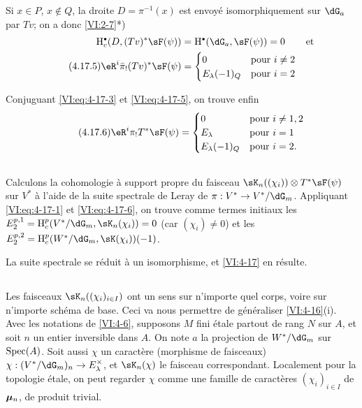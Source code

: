 Si $x\in P$, $x\notin Q$, la droite $D=\pi^{-1}(x)$ est envoy\'e 
isomorphiquement sur $\dG_a$ par $T v$; on a donc 
\ref{VI:2-7}*) 
\begin{align} \notag 
  \h_c^\bullet(D,(T v)^\ast \sF(\psi)) &= \h^\bullet(\dG_a,\sF(\psi)) = 0 && \text{et} \\
  \tag{4.17.5}\label{VI:eq:4-17-5}
  \eR^i \bar\pi_! (T v)^\ast \sF(\psi) 
    &= \begin{cases} 
         0 & \text{pour $i\ne 2$} \\
         E_\lambda(-1)_Q & \text{pour $i=2$} 
       \end{cases} 
\end{align}

Conjuguant \eqref{VI:eq:4-17-3} et \eqref{VI:eq:4-17-5}, on trouve enfin 
\begin{equation*}\tag{4.17.6}\label{VI:eq:4-17-6}
  \eR^i \pi_! T^\ast\sF(\psi) = 
    \begin{cases}
      0 & \text{pour $i\ne 1,2$} \\
      E_\lambda & \text{pour $i=1$} \\
      E_\lambda(-1)_Q & \text{pour $i=2$.} 
    \end{cases}
\end{equation*}





\subsection{}\label{VI:4-18}

Calculons la cohomologie \`a support propre du faisceau 
$\sK_n((\chi_i))\otimes T^\ast \sF(\psi)$ sur $V^\ast$ \`a l'aide de la suite 
spectrale de Leray de $\pi:V^\ast\to V^\ast/\dG_m$. Appliquant 
\eqref{VI:eq:4-17-1} et \eqref{VI:eq:4-17-6}, on trouve comme termes initiaux 
les $E_2^{p,1} = \h_c^p(V^\ast/\dG_m,\sK_n(\chi_i)) = 0$ (car $(\chi_i)\ne 0$) 
et les $E_2^{p,2} = \h_c^p(W^\ast/\dG_m,\sK(\chi_i))(-1)$. 

La suite spectrale se r\'eduit \`a un isomorphisme, et \ref{VI:4-17} en 
r\'esulte. 





\subsection{}\label{VI:4-19}

Les faisceaux $\sK_n((\chi_i)_{i\in I})$ ont un sens sur n'importe quel corps, 
voire sur n'importe sch\'ema de base. Ceci va nous permettre de g\'en\'eraliser 
\ref{VI:4-16}(i). Avec les notations de \ref{VI:4-6}, supposons $M$ fini 
\'etale partout de rang $N$ sur $A$, et soit $n$ un entier inversible dans $A$. 
On note $a$ la projection de $W^\ast/\dG_m$ sur $\operatorname{Spec}(A)$. Soit aussi $\chi$ 
un caract\`ere (morphisme de faisceaux) 
$\chi:(V^\ast/\dG_m)_n \to E_\lambda^\times$, et $\sK_n(\chi)$ le faisceau 
correspondant. Localement pour la topologie \'etale, on peut regarder $\chi$ 
comme une famille de caract\`eres $(\chi_i)_{i\in I}$ de ${\bm\mu}_n$, de produit 
trivial. 





